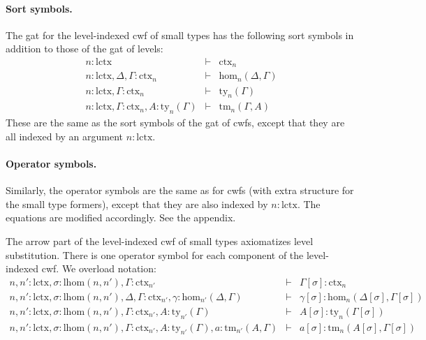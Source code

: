 \documentclass[submission,copyright,creativecommons]{eptcs}
\def\lhom{\mathrm{lhom}}
\def\sub{\mathrm{hom}}
\def\lctx{\mathrm{lctx}}
\newcommand{\ctx}{\mathrm{ctx}}
\newcommand{\ty}{\mathrm{ty}}
\newcommand{\tm}{\mathrm{tm}}
\begin{document}
\paragraph{Sort symbols.} The gat for the level-indexed cwf of small types has the following sort symbols in addition to those of the gat of levels:
\begin{eqnarray*}
n : \lctx &\vdash& \ctx_n\\
n : \lctx, \Delta, \Gamma : \ctx_n &\vdash& \sub_n(\Delta,\Gamma)\\
n : \lctx, \Gamma : \ctx_n &\vdash& \ty_n(\Gamma)\\
n : \lctx, \Gamma : \ctx_n, A:\ty_n(\Gamma) &\vdash& \tm_n(\Gamma,A)
\end{eqnarray*}
These are the same as the sort symbols of the gat of cwfs, except that they are all indexed by an argument $n : \lctx$.

\paragraph{Operator symbols.} Similarly, the operator symbols are the same as for cwfs (with extra structure for the small type formers), except that they are also indexed by $n : \lctx$. The equations are modified accordingly. See the appendix.

The arrow part of the level-indexed cwf of small types axiomatizes level substitution. There is one operator symbol for each component of the level-indexed cwf. We overload notation:
\begin{eqnarray*}
n, n' : \lctx , \sigma : \lhom(n,n'), \Gamma : \ctx_{n'} &\vdash&
\Gamma[\sigma] : \ctx_n\\
n, n' : \lctx , \sigma : \lhom(n,n'), \Delta,\Gamma : \ctx_{n'}, \gamma : \sub_{n'}(\Delta,\Gamma)
&\vdash&
\gamma[\sigma] : \sub_{n}(\Delta[\sigma],\Gamma[\sigma]) \\
n, n' : \lctx , \sigma : \lhom(n,n'), \Gamma : \ctx_{n'}, A:\ty_{n'}(\Gamma)
&\vdash&
A[\sigma]: \ty_n(\Gamma[\sigma])\\
n,n' : \lctx , \sigma : \lhom(n,n'), \Gamma : \ctx_{n'}, A:\ty_{n'}(\Gamma), a : \tm_{n'}(A,\Gamma)
&\vdash&
a[\sigma] : \tm_{n}(A[\sigma],\Gamma[\sigma])
\end{eqnarray*}
\end{document}
